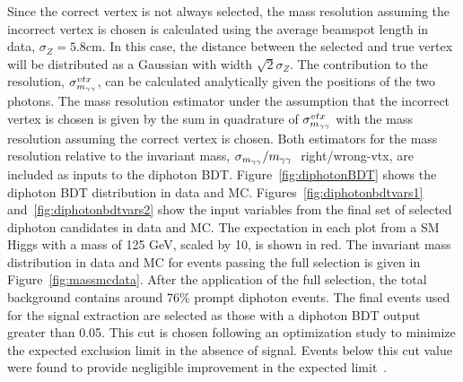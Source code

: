 Since the correct vertex is not always selected, the mass resolution assuming the incorrect vertex is chosen
is calculated using the average beamspot length in data, $\sigma_{Z}=5.8$cm. In this case, the distance 
between the selected and true vertex will be distributed as a Gaussian with width $\sqrt{2}\sigma_{Z}$.
The contribution to the resolution, $\sigma_{m_{\gamma\gamma}}^{vtx}$, can be calculated analytically given the positions of
the two photons. The mass resolution estimator under the assumption that the incorrect vertex is chosen is 
given by the sum in quadrature of $\sigma_{m_{\gamma\gamma}}^{vtx}$ with the mass resolution assuming the correct vertex is chosen.
Both estimators for the mass resolution relative to the invariant mass, $\sigma_{m_{\gamma\gamma}}/m_{\gamma\gamma}~$ right/wrong-vtx, 
are included as inputs to the diphoton BDT. Figure~\ref{fig:diphotonBDT} shows the diphoton BDT distribution in 
data and MC. 
Figures~\ref{fig:diphotonbdtvars1} and~\ref{fig:diphotonbdtvars2} show the input variables from the 
final set of selected diphoton candidates in data and MC. 
The expectation in each plot from a SM Higgs with a mass of 125 GeV, scaled by 10, is shown in red. 
The invariant mass distribution in data and MC for events passing the full
selection is given in Figure~\ref{fig:massmcdata}. After the application of the full selection, 
the total background contains around 76\% prompt diphoton events.
The final events used for 
the signal extraction are selected as those with a diphoton BDT output greater than 0.05. This cut is chosen
following an optimization study to minimize the expected exclusion limit in the absence of signal.
Events below this cut value were found to provide negligible improvement in the expected limit~\citep{AN-12-048}.


